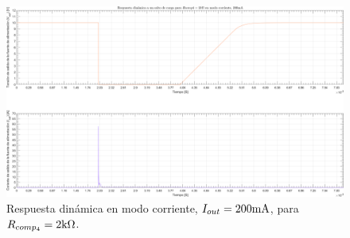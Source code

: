 \clearpage

\begin{figure}[H] %
\begin{center}
\includegraphics[width=1.1 \textwidth, angle=90]{./img/plots/dynamic/power_supply_RCOMP4_2k_STEP_Modo4.png}
\caption{\label{fig:fig_power_supply_RCOMP4_STEP_2k_Modo4}\footnotesize{Respuesta dinámica en modo corriente, $I_{out} = 200 \si[per-mode=symbol]{\milli\ampere}$, para $R_{comp_{4}} = 2 \si[per-mode=symbol]{\kilo\ohm} $.}}
\end{center}
\end{figure}

\clearpage




